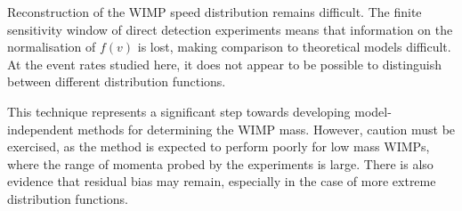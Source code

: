 Reconstruction of the WIMP speed distribution remains difficult. The finite sensitivity window of direct detection experiments means that information on the normalisation of \(f(v)\) is lost, making comparison to theoretical models difficult. At the event rates studied here, it does not appear to be possible to distinguish between different distribution functions.

This technique represents a significant step towards developing model-independent methods for determining the WIMP mass. However, caution must be exercised, as the method is expected to perform poorly for low mass WIMPs, where the range of momenta probed by the experiments is large. There is also evidence that residual bias may remain, especially in the case of more extreme distribution functions. 



